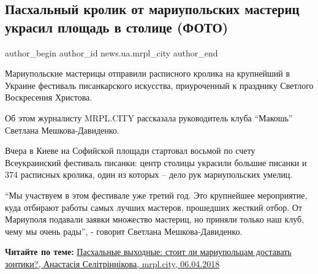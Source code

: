  
 
 
 
 
 
\subsection{Пасхальный кролик от мариупольских мастериц украсил площадь в столице (ФОТО)}
\label{sec:06_04_2018.stz.news.ua.mrpl_city.1.pashalnyj_krolik_mariupol_mastericy_ukrasil}
 
\ifcmt
 author_begin
   author_id news.ua.mrpl_city
 author_end
\fi

Мариупольские мастерицы отправили расписного кролика на крупнейший в Украине
фестиваль писанкарского искусства, приуроченный к празднику Светлого
Воскресения Христова.

Об этом журналисту MRPL.CITY рассказала руководитель клуба \enquote{Макошь} Светлана
Мешкова-Давиденко.

Вчера в Киеве на Софийской площади стартовал восьмой по счету Всеукраинский
фестиваль писанки: центр столицы украсили большие писанки и 374 расписных
кролика, один из которых – дело рук мариупольских умелиц.


\enquote{Мы участвуем в этом фестивале уже третий год. Это крупнейшее мероприятие, куда
отбирают работы самых лучших мастеров, прошедших жесткий отбор. От Мариуполя
подавали заявки множество мастериц, но приняли только наш клуб, чему мы очень
рады}, - говорит Светлана Мешкова-Давиденко.

\textbf{Читайте по теме:} \href{https://mrpl.city/news/view/pashalnye-vyhodnye-stoit-li-mariupoltsam-dostavat-zontiki}{%
Пасхальные выходные: стоит ли мариупольцам доставать зонтики?, Анастасія Селітріннікова, mrpl.city, 06.04.2018%
}

